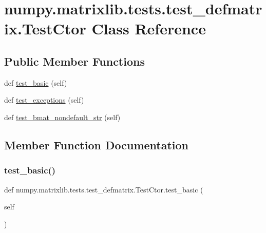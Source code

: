 \hypertarget{classnumpy_1_1matrixlib_1_1tests_1_1test__defmatrix_1_1TestCtor}{}\section{numpy.\+matrixlib.\+tests.\+test\+\_\+defmatrix.\+Test\+Ctor Class Reference}
\label{classnumpy_1_1matrixlib_1_1tests_1_1test__defmatrix_1_1TestCtor}
\subsection*{Public Member Functions}
\begin{DoxyCompactItemize}
\item 
def \hyperlink{classnumpy_1_1matrixlib_1_1tests_1_1test__defmatrix_1_1TestCtor_a51e5609761fb85b5d3ec1e77a950539c}{test\+\_\+basic} (self)
\item 
def \hyperlink{classnumpy_1_1matrixlib_1_1tests_1_1test__defmatrix_1_1TestCtor_afe22425e92e0a28f85954f743cba0ede}{test\+\_\+exceptions} (self)
\item 
def \hyperlink{classnumpy_1_1matrixlib_1_1tests_1_1test__defmatrix_1_1TestCtor_a903bc169f2b141e3249bf8b02525308d}{test\+\_\+bmat\+\_\+nondefault\+\_\+str} (self)
\end{DoxyCompactItemize}


\subsection{Member Function Documentation}
\mbox{\label{classnumpy_1_1matrixlib_1_1tests_1_1test__defmatrix_1_1TestCtor_a51e5609761fb85b5d3ec1e77a950539c}} 
\subsubsection{\texorpdfstring{test\+\_\+basic()}{test\_basic()}}
{\footnotesize\ttfamily def numpy.\+matrixlib.\+tests.\+test\+\_\+defmatrix.\+Test\+Ctor.\+test\+\_\+basic (\begin{DoxyParamCaption}\item[{}]{self }\end{DoxyParamCaption})}

